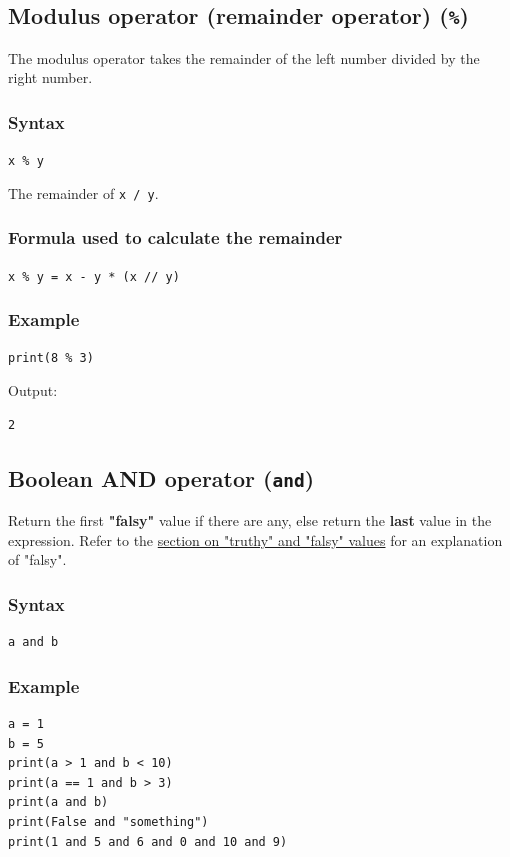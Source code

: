 \documentclass[11pt]{article}
\begin{document}
\subsection{Modulus operator (remainder operator) (\texttt{\%})}
\label{sec:org95466a1}
The modulus operator takes the remainder of the left number divided by the right number.

\subsubsection{Syntax}
\label{sec:orgc3bde75}
\texttt{x \% y}

 \noindent The remainder of \texttt{x / y}.

\subsubsection{Formula used to calculate the remainder}
\label{sec:org7fe7932}
\texttt{x \% y = x - y * (x // y)}

\subsubsection{Example}
\label{sec:orge08abf1}
\begin{verbatim}
print(8 % 3)
\end{verbatim}

 \noindent Output:

\begin{verbatim}
2
\end{verbatim}


 \newpage

\subsection{Boolean AND operator (\texttt{and})}
\label{sec:org2b7a684}
Return the first \textbf{"falsy"} value if there are any, else return the \textbf{last} value in the expression. Refer to the \hyperref[org885cbd7]{section on "truthy" and "falsy" values} for an explanation of "falsy".

\subsubsection{Syntax}
\label{sec:orgdda54e9}
\begin{verbatim}
a and b
\end{verbatim}

\subsubsection{Example}
\label{sec:orgdb0558d}
\begin{verbatim}
a = 1
b = 5
print(a > 1 and b < 10)
print(a == 1 and b > 3)
print(a and b)
print(False and "something")
print(1 and 5 and 6 and 0 and 10 and 9)
\end{verbatim}
\end{document}
